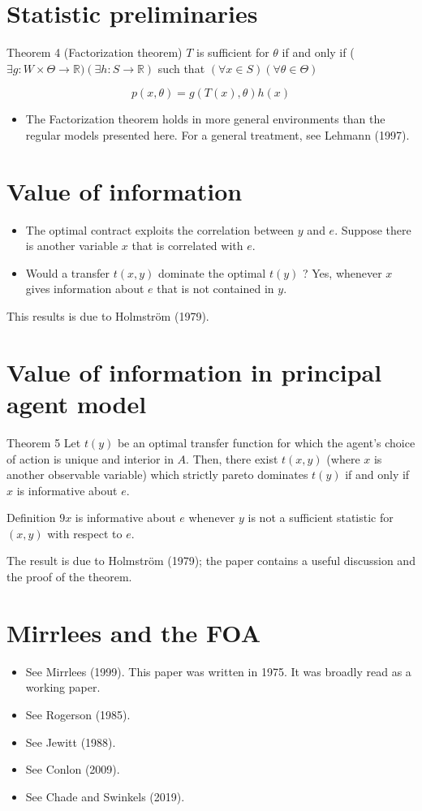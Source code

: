 \documentclass[10pt]{article}
\begin{document}
\section*{Statistic preliminaries}
Theorem 4 (Factorization theorem) $T$ is sufficient for $\theta$ if and only if ( $\exists g : W \times \Theta \rightarrow \mathbb{R})(\exists h: S \rightarrow \mathbb{R})$ such that $(\forall x \in S)(\forall \theta \in \Theta)$

$$
p(x, \theta)=g(T(x), \theta) h(x)
$$

\begin{itemize}
  \item The Factorization theorem holds in more general environments than the regular models presented here. For a general treatment, see Lehmann (1997).
\end{itemize}

\section*{Value of information}
\begin{itemize}
  \item The optimal contract exploits the correlation between $y$ and $e$. Suppose there is another variable $x$ that is correlated with $e$.
  \item Would a transfer $t(x, y)$ dominate the optimal $t(y)$ ? Yes, whenever $x$ gives information about $e$ that is not contained in $y$.
\end{itemize}

This results is due to Holmström (1979).

\section*{Value of information in principal agent model}
Theorem 5 Let $t(y)$ be an optimal transfer function for which the agent's choice of action is unique and interior in $A$. Then, there exist $t(x, y)$ (where $x$ is another observable variable) which strictly pareto dominates $t(y)$ if and only if $x$ is informative about $e$.

Definition $9 x$ is informative about $e$ whenever $y$ is not a sufficient statistic for $(x, y)$ with respect to $e$.

The result is due to Holmström (1979); the paper contains a useful discussion and the proof of the theorem.

\section*{Mirrlees and the FOA}
\begin{itemize}
  \item See Mirrlees (1999). This paper was written in 1975. It was broadly read as a working paper.
  \item See Rogerson (1985).
  \item See Jewitt (1988).
  \item See Conlon (2009).
  \item See Chade and Swinkels (2019).
\end{itemize}
\end{document}
